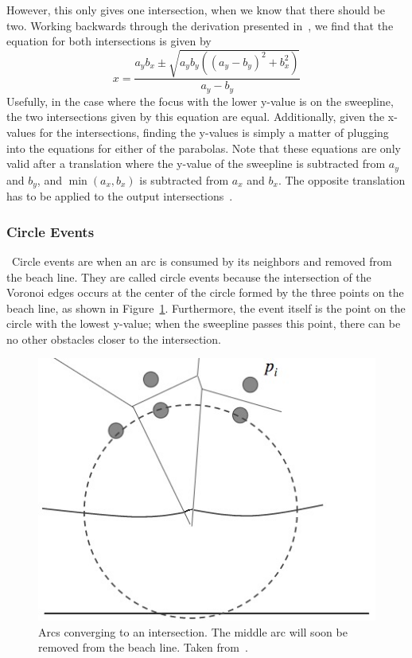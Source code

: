 \documentclass[conference]{IEEEtran}
\begin{document}
However, this only gives one intersection, when we know that there should be two.
Working backwards through the derivation presented in~\cite{schaal}, we find that the
equation for both intersections is given by
\begin{equation}
    x=\frac{a_{y}b_{x}\pm\sqrt{a_{y}b_{y}({(a_{y}-b_{y})}^{2}+b_{x}^{2})}}{a_{y}-b_{y}}
\end{equation}
Usefully, in the case where the focus with the lower y-value is on the sweepline,
the two intersections given by this equation are equal. Additionally, given the
x-values for the intersections, finding the y-values is simply a matter of plugging
into the equations for either of the parabolas.
Note that these equations are only valid after a translation where the y-value of the
sweepline is subtracted from $a_{y}$ and $b_{y}$, and $\min(a_{x}, b_{x})$ is
subtracted from $a_{x}$ and $b_{x}$. The opposite translation has to be applied to the
output intersections~\cite{schaal}.

\subsubsection{Circle Events}
\noindent\ Circle events are when an arc is consumed by its neighbors and removed from the
beach line. They are called circle events because the intersection of the Voronoi
edges occurs at the center of the circle formed by the three points on the beach
line, as shown in Figure~\ref{circle_event}. Furthermore, the event itself is the
point on the circle with the lowest y-value; when the sweepline passes this point,
there can be no other obstacles closer to the intersection.\\

\begin{figure}[tp]
    \includegraphics[width=\columnwidth]{circle_event}
    \caption{Arcs converging to an intersection. The middle arc will soon be
    removed from the beach line. Taken from~\cite{mitslides}.}\label{circle_event}
\end{figure}
\end{document}
